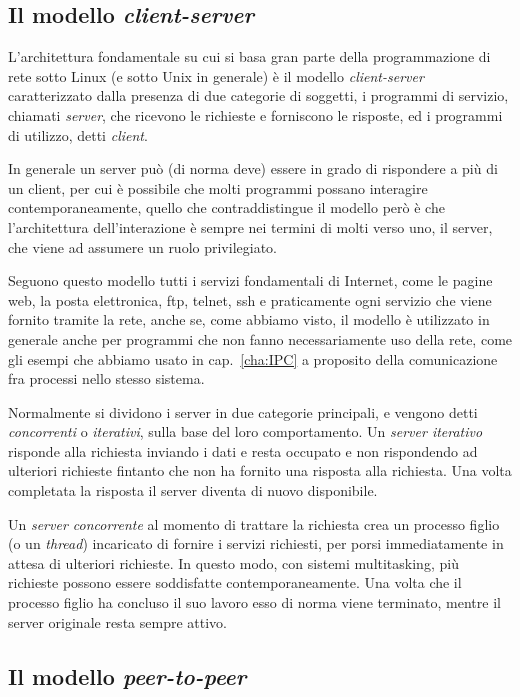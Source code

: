 \subsection{Il modello \textit{client-server}}
\label{sec:net_cliserv}

L'architettura fondamentale su cui si basa gran parte della programmazione di
rete sotto Linux (e sotto Unix in generale) è il modello
\textit{client-server} caratterizzato dalla presenza di due categorie di
soggetti, i programmi di servizio, chiamati \textit{server}, che ricevono le
richieste e forniscono le risposte, ed i programmi di utilizzo, detti
\textit{client}.

In generale un server può (di norma deve) essere in grado di rispondere a più
di un client, per cui è possibile che molti programmi possano interagire
contemporaneamente, quello che contraddistingue il modello però è che
l'architettura dell'interazione è sempre nei termini di molti verso uno, il
server, che viene ad assumere un ruolo privilegiato.

Seguono questo modello tutti i servizi fondamentali di Internet, come le
pagine web, la posta elettronica, ftp, telnet, ssh e praticamente ogni
servizio che viene fornito tramite la rete, anche se, come abbiamo visto, il
modello è utilizzato in generale anche per programmi che non fanno
necessariamente uso della rete, come gli esempi che abbiamo usato in
cap.~\ref{cha:IPC} a proposito della comunicazione fra processi nello stesso
sistema.

Normalmente si dividono i server in due categorie principali, e vengono detti
\textsl{concorrenti} o \textsl{iterativi}, sulla base del loro comportamento.
Un \textsl{server iterativo} risponde alla richiesta inviando i dati e resta
occupato e non rispondendo ad ulteriori richieste fintanto che non ha fornito
una risposta alla richiesta. Una volta completata la risposta il server
diventa di nuovo disponibile.

Un \textsl{server concorrente} al momento di trattare la richiesta crea un
processo figlio (o un \textit{thread}) incaricato di fornire i servizi
richiesti, per porsi immediatamente in attesa di ulteriori richieste. In
questo modo, con sistemi multitasking, più richieste possono essere
soddisfatte contemporaneamente. Una volta che il processo figlio ha concluso
il suo lavoro esso di norma viene terminato, mentre il server originale resta
sempre attivo.


\subsection{Il modello \textit{peer-to-peer}}
\label{sec:net_peertopeer}

